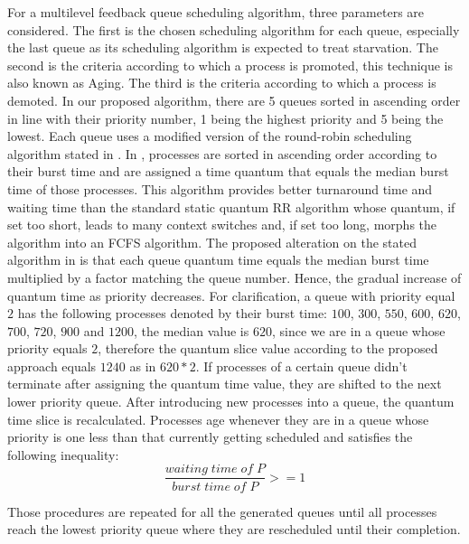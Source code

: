\documentclass[conference]{IEEEtran}
\begin{document}
For a multilevel feedback queue scheduling algorithm, three parameters are considered. The first is the chosen scheduling algorithm for each queue, especially the last queue as its scheduling algorithm is expected to treat starvation. The second is the criteria according to which a process is promoted, this technique is also known as Aging. The third is the criteria according to which a process is demoted. In our proposed algorithm, there are 5 queues sorted in ascending order in line with their priority number, 1 being the highest priority and 5 being the lowest. Each queue uses a modified version of the round-robin scheduling algorithm stated in \cite{b3}. In \cite{b3}, processes are sorted in ascending order according to their burst time and are assigned a time quantum that equals the median burst time of those processes. This algorithm provides better turnaround time and waiting time than the standard static quantum RR algorithm whose quantum, if set too short, leads to many context switches and, if set too long, morphs the algorithm into an FCFS algorithm. The proposed alteration on the stated algorithm in \cite{b3} is that each queue quantum time equals the median burst time multiplied by a factor matching the queue number. Hence, the gradual increase of quantum time as priority decreases. For clarification, a queue with priority equal $2$ has the following processes denoted by their burst time: $100$, $300$, $550$, $600$, $620$, $700$, $720$, $900$ and $1200$, the median value is $620$, since we are in a queue whose priority equals $2$, therefore the quantum slice value according to the proposed approach equals $1240$ as in $620 * 2$. If processes of a certain queue didn't terminate after assigning the quantum time value, they are shifted to the next lower priority queue. After introducing new processes into a queue, the quantum time slice is recalculated. Processes age whenever they are in a queue whose priority is one less than that currently getting scheduled and satisfies the following inequality:
\begin{equation}
\frac{waiting \; time \; of \; P}{burst \; time \; of \; P} >= 1\label{eq1}
\end{equation}

Those procedures are repeated for all the generated queues until all processes reach the lowest priority queue where they are rescheduled until their completion. 

\end{document}
